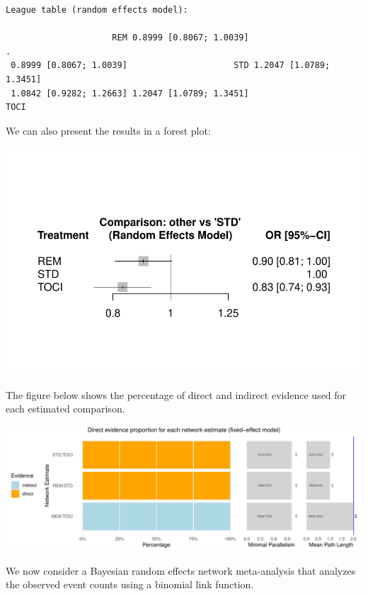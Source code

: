 \documentclass[
  letterpaper,
  DIV=11,
  numbers=noendperiod]{scrreprt}
\begin{document}
\begin{verbatim}
League table (random effects model):
                                                                        
                     REM 0.8999 [0.8067; 1.0039]                       .
 0.8999 [0.8067; 1.0039]                     STD 1.2047 [1.0789; 1.3451]
 1.0842 [0.9282; 1.2663] 1.2047 [1.0789; 1.3451]                    TOCI
\end{verbatim}

We can also present the results in a forest plot:

\includegraphics{chapter_10_files/figure-pdf/unnamed-chunk-14-1.pdf}

The figure below shows the percentage of direct and indirect evidence
used for each estimated comparison.

\includegraphics{chapter_10_files/figure-pdf/unnamed-chunk-15-1.pdf}

We now consider a Bayesian random effects network meta-analysis that
analyzes the observed event counts using a binomial link function.
\end{document}
